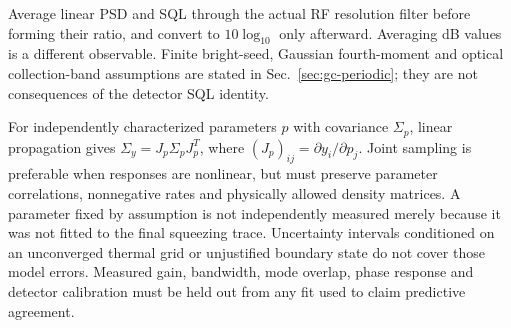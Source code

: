 Average linear PSD and SQL through the actual RF resolution filter before
forming their ratio, and convert to $10\log_{10}$ only afterward. Averaging
dB values is a different observable. Finite bright-seed, Gaussian fourth-moment
and optical collection-band assumptions are stated in
Sec.~\ref{sec:gc-periodic}; they are not consequences of the detector SQL
identity.

For independently characterized parameters $p$ with covariance $\Sigma_p$,
linear propagation gives $\Sigma_y=J_p\Sigma_pJ_p^T$, where
$(J_p)_{ij}=\partial y_i/\partial p_j$. Joint sampling is preferable when
responses are nonlinear, but must preserve parameter correlations,
nonnegative rates and physically allowed density matrices. A parameter fixed
by assumption is not independently measured merely because it was not fitted
to the final squeezing trace. Uncertainty intervals conditioned on an
unconverged thermal grid or unjustified boundary state do not cover those
model errors. Measured gain, bandwidth, mode overlap, phase response and
detector calibration must be held out from any fit used to claim predictive
agreement.
